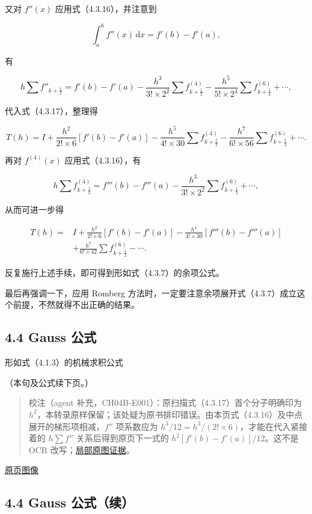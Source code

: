 \documentclass[
  10pt,
  fontset=fandol]{ctexart}
\begin{document}
又对 \(f''(x)\) 应用式（4.3.16），并注意到

\[
\int_a^b f''(x)\,\mathrm{d}x=f'(b)-f'(a),
\]

有

\[
h\sum f''_{k+\frac12}=f'(b)-f'(a)
-\frac{h^3}{3!\times2^2}\sum f^{(4)}_{k+\frac12}
-\frac{h^5}{5!\times2^4}\sum f^{(6)}_{k+\frac12}+\cdots,
\]

代入式（4.3.17），整理得

\[
T(h)=I+\frac{h^2}{2!\times6}[f'(b)-f'(a)]
-\frac{h^5}{4!\times30}\sum f^{(4)}_{k+\frac12}
-\frac{h^7}{6!\times56}\sum f^{(6)}_{k+\frac12}+\cdots.
\]

再对 \(f^{(4)}(x)\) 应用式（4.3.16），有

\[
h\sum f^{(4)}_{k+\frac12}=f'''(b)-f'''(a)
-\frac{h^3}{3!\times2^2}\sum f^{(6)}_{k+\frac12}+\cdots,
\]

从而可进一步得

\[
\begin{aligned}
T(h)={}&I+\frac{h^2}{2!\times6}[f'(b)-f'(a)]
-\frac{h^4}{4!\times30}[f'''(b)-f'''(a)]\\
&+\frac{h^7}{6!\times42}\sum f^{(6)}_{k+\frac12}-\cdots.
\end{aligned}
\tag{4.3.18}
\]

反复施行上述手续，即可得到形如式（4.3.7）的余项公式。

最后再强调一下，应用 Romberg 方法时，一定要注意余项展开式（4.3.7）成立这个前提，不然就得不出正确的结果。

\subsection{4.4 Gauss 公式}\label{gauss-ux516cux5f0f}

形如式（4.1.3）的机械求积公式

（本句及公式续下页。）

\begin{quote}
校注（agent 补充，CH04B-E001）：原扫描式（4.3.17）首个分子明确印为 \(h^2\)，本转录原样保留；该处疑为原书排印错误。由本页式（4.3.16）及中点展开的梯形项相减，\(f''\) 项系数应为 \(h^3/12=h^3/(2!\times6)\)，才能在代入紧接着的 \(h\sum f''\) 关系后得到原页下一式的 \(h^2[f'(b)-f'(a)]/12\)。这不是 OCR 改写；\href{../assets/ch04b/review-p106-middle.png}{局部原图证据}。
\end{quote}

\href{../../source-images/pdf-107.jpeg}{原页图像}

\subsection{4.4 Gauss 公式（续）}\label{gauss-ux516cux5f0fux7eed}
\end{document}
